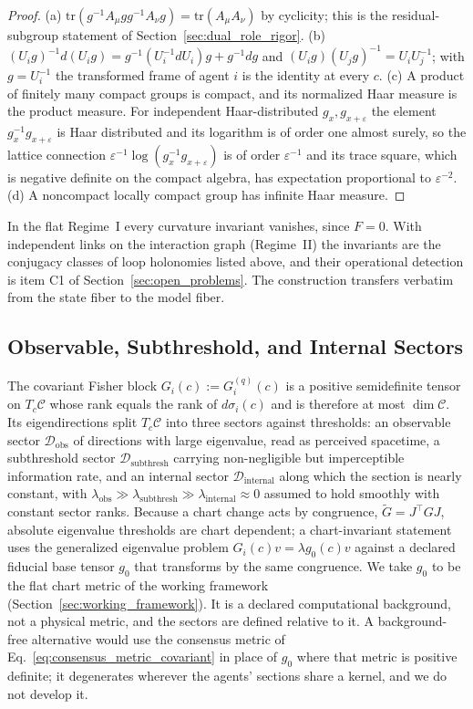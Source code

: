 \begin{proof}
(a) $\mathrm{tr}(g^{-1}A_\mu g g^{-1}A_\nu g) = \mathrm{tr}(A_\mu A_\nu)$ by cyclicity; this is the residual-subgroup statement of Section~\ref{sec:dual_role_rigor}. (b) $(U_i g)^{-1} d(U_i g) = g^{-1}(U_i^{-1} dU_i) g + g^{-1} dg$ and $(U_i g)(U_j g)^{-1} = U_i U_j^{-1}$; with $g = U_i^{-1}$ the transformed frame of agent $i$ is the identity at every $c$. (c) A product of finitely many compact groups is compact, and its normalized Haar measure is the product measure. For independent Haar-distributed $g_x, g_{x+\varepsilon}$ the element $g_x^{-1}g_{x+\varepsilon}$ is Haar distributed and its logarithm is of order one almost surely, so the lattice connection $\varepsilon^{-1}\log(g_x^{-1}g_{x+\varepsilon})$ is of order $\varepsilon^{-1}$ and its trace square, which is negative definite on the compact algebra, has expectation proportional to $\varepsilon^{-2}$. (d) A noncompact locally compact group has infinite Haar measure.
\end{proof}
In the flat Regime~I every curvature invariant vanishes, since $F = 0$. With independent links on the interaction graph (Regime~II) the invariants are the conjugacy classes of loop holonomies listed above, and their operational detection is item C1 of Section~\ref{sec:open_problems}. The construction transfers verbatim from the state fiber to the model fiber.

\subsection{Observable, Subthreshold, and Internal Sectors}
\label{sec:observable_sectors}

The covariant Fisher block $G_i(c) := G^{(q)}_i(c)$ is a positive semidefinite tensor on $T_c\mathcal{C}$ whose rank equals the rank of $d\sigma_i(c)$ and is therefore at most $\dim\mathcal{C}$. Its eigendirections split $T_c\mathcal{C}$ into three sectors against thresholds: an observable sector $\mathcal{D}_{\text{obs}}$ of directions with large eigenvalue, read as perceived spacetime, a subthreshold sector $\mathcal{D}_{\text{subthresh}}$ carrying non-negligible but imperceptible information rate, and an internal sector $\mathcal{D}_{\text{internal}}$ along which the section is nearly constant, with $\lambda_{\text{obs}} \gg \lambda_{\text{subthresh}} \gg \lambda_{\text{internal}} \approx 0$ assumed to hold smoothly with constant sector ranks. Because a chart change acts by congruence, $\tilde{G} = J^\top G J$, absolute eigenvalue thresholds are chart dependent; a chart-invariant statement uses the generalized eigenvalue problem $G_i(c) v = \lambda g_0(c) v$ against a declared fiducial base tensor $g_0$ that transforms by the same congruence. We take $g_0$ to be the flat chart metric of the working framework (Section~\ref{sec:working_framework}). It is a declared computational background, not a physical metric, and the sectors are defined relative to it. A background-free alternative would use the consensus metric of Eq.~\eqref{eq:consensus_metric_covariant} in place of $g_0$ where that metric is positive definite; it degenerates wherever the agents' sections share a kernel, and we do not develop it.

